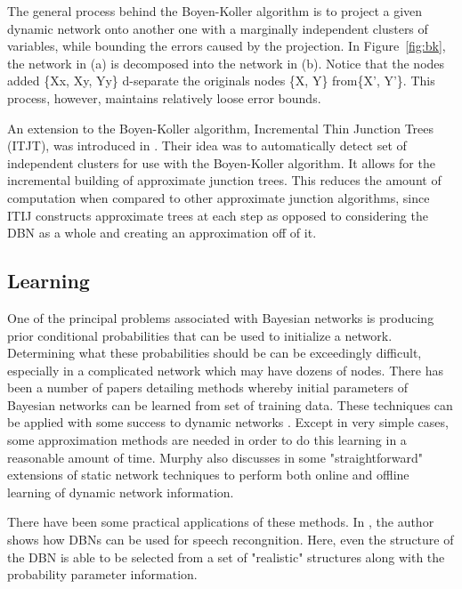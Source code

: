 \documentclass{article}
\begin{document}
The general process behind the Boyen-Koller algorithm is to project a given dynamic network onto another one with a marginally independent clusters of variables, while bounding the errors caused by the projection. In Figure~\ref{fig:bk}, the network in (a) is decomposed into the network in (b). Notice that the nodes added \{Xx, Xy, Yy\} d-separate the originals nodes \{X, Y\} from\{X', Y'\}. This process, however, maintains relatively loose error bounds.

An extension to the Boyen-Koller algorithm, Incremental Thin Junction Trees (ITJT), was introduced in \cite{hutter04incremental}. Their idea was to automatically detect set of independent clusters for use with the Boyen-Koller algorithm. It allows for the incremental building of approximate junction trees. This reduces the amount of computation when compared to other approximate junction algorithms, since ITIJ constructs approximate trees at each step as opposed to considering the DBN as a whole and creating an approximation off of it. 

\subsection{Learning}
One of the principal problems associated with Bayesian networks is producing prior conditional probabilities that can be used to initialize a network. Determining what these probabilities should be can be exceedingly difficult, especially in a complicated network which may have dozens of nodes. There has been a number of papers detailing methods whereby initial parameters of Bayesian networks can be learned from set of training data. These techniques can be applied with some success to dynamic networks \cite{ghahramani98learning}. Except in very simple cases, some approximation methods are needed in order to do this learning in a reasonable amount of time. Murphy also discusses in \cite{murphy} some "straightforward" extensions of static network techniques to perform both online and offline learning of dynamic network information. 

There have been some practical applications of these methods. In \cite{deviren01structural}, the author shows how DBNs can be used for speech recongnition. Here, even the structure of the DBN is able to be selected from a set of "realistic" structures along with the probability parameter information. 
\end{document}
